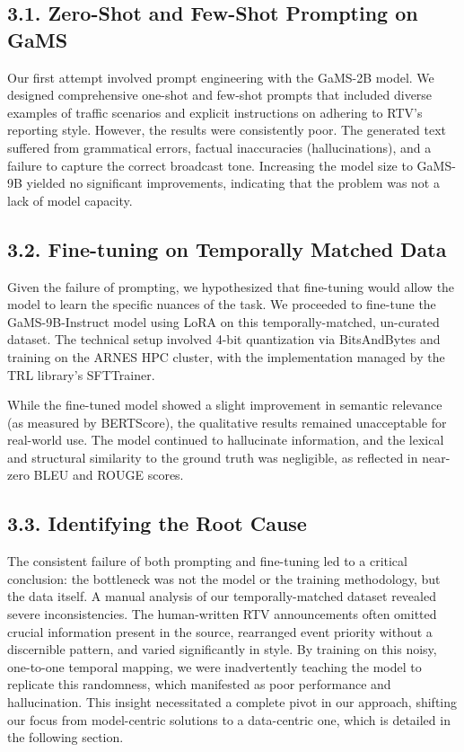 \documentclass[fleqn,moreauthors,10pt]{ds_report}
\begin{document}
\subsection*{3.1. Zero-Shot and Few-Shot Prompting on GaMS}
Our first attempt involved prompt engineering with the GaMS-2B model. We designed comprehensive one-shot and few-shot prompts that included diverse examples of traffic scenarios and explicit instructions on adhering to RTV's reporting style. However, the results were consistently poor. The generated text suffered from grammatical errors, factual inaccuracies (hallucinations), and a failure to capture the correct broadcast tone. Increasing the model size to GaMS-9B yielded no significant improvements, indicating that the problem was not a lack of model capacity.

\subsection*{3.2. Fine-tuning on Temporally Matched Data}
Given the failure of prompting, we hypothesized that fine-tuning would allow the model to learn the specific nuances of the task. We proceeded to fine-tune the GaMS-9B-Instruct model using LoRA on this temporally-matched, un-curated dataset. The technical setup involved 4-bit quantization via BitsAndBytes and training on the ARNES HPC cluster, with the implementation managed by the TRL library's SFTTrainer.

While the fine-tuned model showed a slight improvement in semantic relevance (as measured by BERTScore), the qualitative results remained unacceptable for real-world use. The model continued to hallucinate information, and the lexical and structural similarity to the ground truth was negligible, as reflected in near-zero BLEU and ROUGE scores.

\subsection*{3.3. Identifying the Root Cause}
The consistent failure of both prompting and fine-tuning led to a critical conclusion: the bottleneck was not the model or the training methodology, but the data itself. A manual analysis of our temporally-matched dataset revealed severe inconsistencies. The human-written RTV announcements often omitted crucial information present in the source, rearranged event priority without a discernible pattern, and varied significantly in style. By training on this noisy, one-to-one temporal mapping, we were inadvertently teaching the model to replicate this randomness, which manifested as poor performance and hallucination. This insight necessitated a complete pivot in our approach, shifting our focus from model-centric solutions to a data-centric one, which is detailed in the following section.
\end{document}
